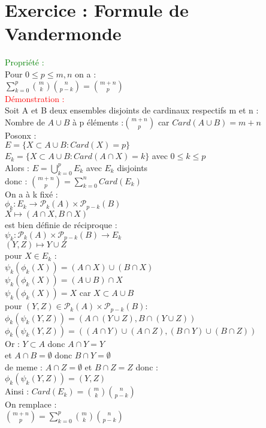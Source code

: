 \documentclass{article}
\begin{document}
\section{ Exercice : Formule de Vandermonde}
\textcolor{green}{Propriété :} \\
Pour $0 \leq p \leq m,n$ on a : \\
$\sum_{k=0}^p \binom{m}{k} \binom{n}{p-k}= \binom{m+n}{p}$ \\
\textcolor{red}{Démonstration :} \\
Soit A et B deux ensembles disjoints de cardinaux respectifs m et n : \\
Nombre de $A\cup B$ à p éléments :$\binom{m+n}{p}$ car $Card(A \cup B)=m+n$ \\
Posonx : \\
$E=\lbrace X \subset A\cup B : Card(X)=p \rbrace $ \\
$E_k= \lbrace X \subset A \cup B : Card(A \cap X)=k  \rbrace $ avec $0 \leq k \leq p$ \\
Alors : $E= \bigcup_{k=0}^p E_k$ avec $E_k$ disjoints \\
donc : $\binom{m+n}{p}= \sum_{k=0}^n Card(E_k)$ \\
On a à k fixé : \\
$\phi_k : E_k \rightarrow  \mathcal P_k(A) \times \mathcal P_{p-k}(B)$ \\
$X \mapsto (A \cap X, B \cap X)$ \\
est bien définie de réciproque : \\
$\psi_k: \mathcal P_k(A) \times \mathcal P_{p-k} (B) \rightarrow E_k$ \\
$(Y,Z) \mapsto Y \cup Z$ \\
pour $X \in E_k$ : \\
$\psi_k(\phi_k(X))=(A\cap X) \cup (B \cap X)$ \\
$\psi_k(\phi_k(X))=(A\cup B)\cap X$ \\
$\psi_k(\phi_k(X))=X$ car $X \subset A\cup B$ \\
pour $(Y,Z) \in \mathcal P_k(A) \times \mathcal P_{p-k}(B) :$ \\
$\phi_k(\psi_k(Y,Z))=(A\cap(Y\cup Z), B \cap(Y \cup Z))$ \\
$\phi_k(\psi_k(Y,Z))=((A\cap Y)\cup(A \cap Z),(B\cap Y) \cup (B \cap Z))$ \\
Or : $Y \subset A$ donc $A\cap Y= Y$ \\
et $A\cap B= \emptyset$ donc $B \cap Y=\emptyset$ \\
de meme : $A \cap Z = \emptyset$ et $B \cap Z=Z$ donc : \\
$\phi_k(\psi_k(Y,Z))=(Y,Z)$ \\
Ainsi : $Card(E_k)=\binom{m}{k} \binom{n}{p-k} $ \\
On remplace : \\
$\binom{m+n}{p}= \sum_{k=0}^p \binom{m}{k} \binom{n}{p-k}$ \\
\end{document}
